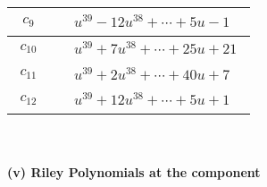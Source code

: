 \documentclass[1p]{elsarticle_modified}
\theoremstyle{definition}
\begin{document}
\begin{tabular}{m{50pt}|m{274pt}}
\hline $$\begin{aligned}c_{9}\end{aligned}$$&$\begin{aligned}
&u^{39}-12 u^{38}+\cdots+5 u-1
\end{aligned}$\\
\hline $$\begin{aligned}c_{10}\end{aligned}$$&$\begin{aligned}
&u^{39}+7 u^{38}+\cdots+25 u+21
\end{aligned}$\\
\hline $$\begin{aligned}c_{11}\end{aligned}$$&$\begin{aligned}
&u^{39}+2 u^{38}+\cdots+40 u+7
\end{aligned}$\\
\hline $$\begin{aligned}c_{12}\end{aligned}$$&$\begin{aligned}
&u^{39}+12 u^{38}+\cdots+5 u+1
\end{aligned}$\\
\hline
\end{tabular}\\~\\
\newpage\renewcommand{\arraystretch}{1}
\flushleft \textbf{(v) Riley Polynomials at the component}\newline \\
\end{document}
